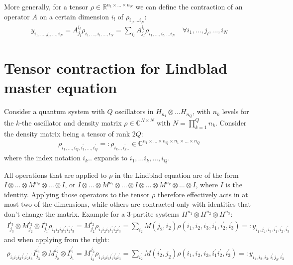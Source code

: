 \documentclass[letterpaper]{article}
\newcommand{\R}{\mathds{R}}
\newcommand{\C}{\mathds{C}}
\begin{document}
More generally, for a tensor $\rho \in \R^{n_1\times \dots \times n_N}$ we can define the contraction of an operator $A$ on a certain dimension $i_l$ of $\rho_{i_1,\dots i_N}$:
\begin{align}
    y_{i_1,\dots,j_l,\dots,i_N} = A_{j_l}^{i_l} \rho_{i_1,\dots,i_l,\dots,i_N} = \sum_{i_l} A_{j_l}^{i_l} \rho_{i_1,\dots,i_l,\dots i_N} \quad \forall i_1,\dots, j_l,\dots,i_N
\end{align}



\section{Tensor contraction for Lindblad master equation}
Consider a quantum system with $Q$ oscillators in $H_{n_1} \otimes \dots H_{n_Q}$, with $n_k$ levels for the $k$-the oscillator and density matrix $\rho \in \C^{N\times N}$ with $N=\prod_{k=1}^{Q} n_k$. Consider the density matrix being a tensor of rank $2Q$: 
\begin{align}
    \rho_{i_1,\dots, i_Q, i_1^{\prime}, \dots, i_Q^{\prime}} =: \rho_{i_k .., i_k^\prime..}\in\C^{n_1\times \dots \times n_Q \times n_1 \times \dots \times n_Q}
\end{align}
where the index notation $i_k..$ expands to $i_1,\dots i_k, \dots,i_Q$.

All operations that are applied to $\rho$ in the Lindblad equation are of the form $I\otimes \dots \otimes M^{n_k} \otimes \dots \otimes I$, or $I\otimes \dots \otimes M^{n_l} \otimes \dots \otimes I \otimes \dots \otimes M^{n_k} \otimes \dots \otimes I$, where $I$ is the identity. Applying those operators to the tensor $\rho$ therefore effectively acts in at most two of the dimensions, while others are contracted only with identities that don't change the matrix. Example for a 3-partite systems $H^{n_1} \otimes H^{n_2} \otimes H^{n_3}$:
\begin{align}
    I^{i_3}_{j_3}\otimes M^{i_2}_{j_2} \otimes I^{i_1}_{j_1} \rho_{i_1i_2i_3i_1^{\prime}i_2^\prime i_3^\prime} = M^{i_2}_{j_2} \rho_{i_1i_2i_3i_1^{\prime}i_2^\prime i_3^\prime} = \sum_{i_2} M(j_2, i_2) \rho(i_1,i_2,i_3,i_1^{\prime},i_2^\prime, i_3^\prime)  =: y_{i_1,j_2,i_3,i_1^{\prime},i_2^\prime,i_3^\prime}
\end{align}
and when applying from the right:
\begin{align}
    \rho_{i_1i_2i_3i_1^{\prime}i_2^\prime i_3^\prime}I^{i_3^{\prime}}_{j_3}\otimes M^{i_2^\prime}_{j_2} \otimes I^{i_1^\prime}_{j_1}  = M^{j_2}_{i_2^\prime} \rho_{i_1i_2i_3i_1^{\prime}i_2^\prime i_3^\prime} = \sum_{i_2^\prime} M(i_2^{\prime}, j_2) \rho(i_1,i_2,i_3,i_1^{\prime}i_2^\prime, i_3^\prime)  =: y_{i_1,i_2,i_3,i_1^{\prime}j_2, i_3^\prime}
\end{align}
\end{document}

